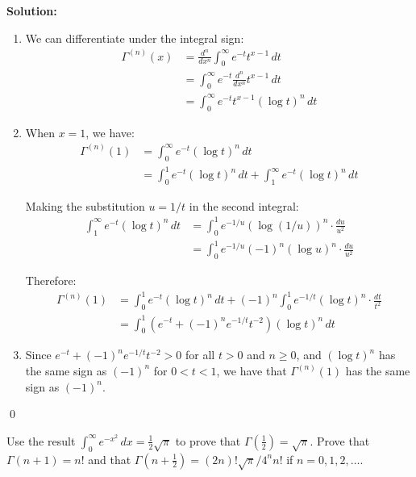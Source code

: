 \bigskip\noindent\textbf{Solution:}
\begin{enumerate}[label=(\alph*)]
\item We can differentiate under the integral sign:
\begin{align*}
\Gamma^{(n)}(x) &= \frac{d^{n}}{dx^{n}} \int_{0}^{\infty} e^{-t} t^{x-1} \, dt \\
&= \int_{0}^{\infty} e^{-t} \frac{d^{n}}{dx^{n}} t^{x-1} \, dt \\
&= \int_{0}^{\infty} e^{-t} t^{x-1} (\log t)^{n} \, dt
\end{align*}

\item When $x = 1$, we have:
\begin{align*}
\Gamma^{(n)}(1) &= \int_{0}^{\infty} e^{-t} (\log t)^{n} \, dt \\
&= \int_{0}^{1} e^{-t} (\log t)^{n} \, dt + \int_{1}^{\infty} e^{-t} (\log t)^{n} \, dt
\end{align*}

Making the substitution $u = 1/t$ in the second integral:
\begin{align*}
\int_{1}^{\infty} e^{-t} (\log t)^{n} \, dt &= \int_{0}^{1} e^{-1/u} (\log(1/u))^{n} \cdot \frac{du}{u^{2}} \\
&= \int_{0}^{1} e^{-1/u} (-1)^{n} (\log u)^{n} \cdot \frac{du}{u^{2}}
\end{align*}

Therefore:
\begin{align*}
\Gamma^{(n)}(1) &= \int_{0}^{1} e^{-t} (\log t)^{n} \, dt + (-1)^{n} \int_{0}^{1} e^{-1/t} (\log t)^{n} \cdot \frac{dt}{t^{2}} \\
&= \int_{0}^{1} (e^{-t} + (-1)^{n} e^{-1/t} t^{-2}) (\log t)^{n} \, dt
\end{align*}

\item Since $e^{-t} + (-1)^{n} e^{-1/t} t^{-2} > 0$ for all $t > 0$ and $n \geq 0$, and $(\log t)^{n}$ has the same sign as $(-1)^{n}$ for $0 < t < 1$, we have that $\Gamma^{(n)}(1)$ has the same sign as $(-1)^{n}$.
\end{enumerate}\qed


\begin{problembox}
Use the result $\int_{0}^{\infty} e^{-x^{2}} \, dx = \frac{1}{2} \sqrt{\pi}$ to prove that $\Gamma(\frac{1}{2}) = \sqrt{\pi}$. Prove that $\Gamma(n + 1) = n!$ and that $\Gamma(n + \frac{1}{2}) = (2n)! \sqrt{\pi}/4^{n}n!$ if $n = 0, 1, 2, \ldots$.
\end{problembox}

